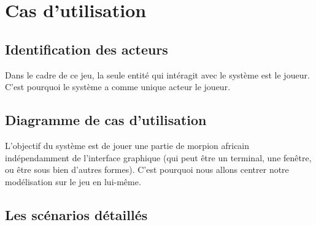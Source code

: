 \documentclass[12pt , a4paper]{article}
\begin{document}
\newpage
\section{Cas d'utilisation}
\subsection{Identification des acteurs}
Dans le cadre de ce jeu, la seule entité qui intéragit avec le système est le joueur. C'est pourquoi le système a comme unique acteur le joueur.
\subsection{Diagramme de cas d'utilisation}
\begin{center}
\end{center}

\noindent L'objectif du système est de jouer une partie de morpion africain indépendamment de l'interface graphique (qui peut être un terminal, une fenêtre, ou être sous bien d'autres formes). C'est pourquoi nous allons centrer notre modélisation sur le jeu en lui-même.

\newpage 
\subsection{Les scénarios détaillés}
\end{document}

